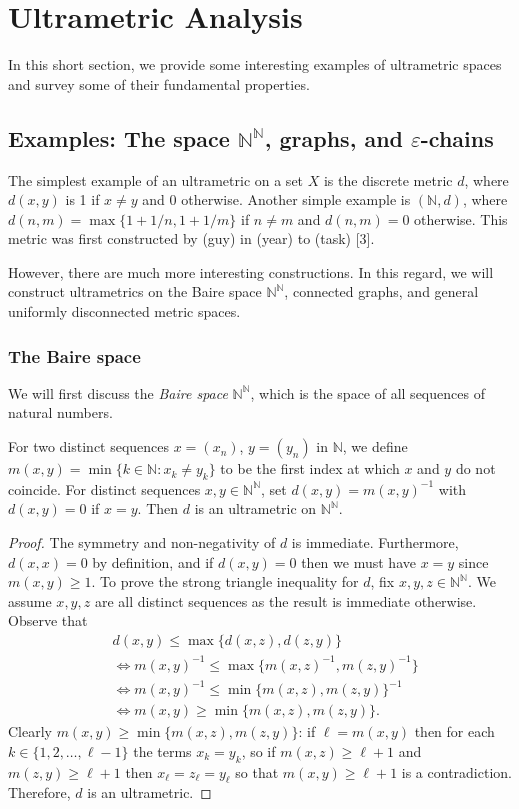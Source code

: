 \section{Ultrametric Analysis}
In this short section, we provide some interesting examples of ultrametric spaces and survey some of their fundamental properties.
\subsection{Examples: The space \( \mathbb{N} ^{\mathbb{N} } \), graphs, and \( \varepsilon  \)-chains} The simplest example of an ultrametric on a set $X$ is the discrete metric $d$, where $d(x,y)$ is 1 if $x \neq y$ and 0 otherwise. Another simple example is $(\mathbb{N}, d)$, where \( d(n,m) = \max \{ 1 + 1/n , 1 + 1/m \}  \) if \( n \neq m \) and \( d(n, m) = 0 \) otherwise. This metric was first constructed by (guy) in (year) to (task) [3]. 

However, there are much more interesting constructions. In this regard, we will construct ultrametrics on the Baire space $\mathbb{N} ^{\mathbb{N} }$, connected graphs, and general uniformly disconnected metric spaces.

\subsubsection{The Baire space} We will first discuss the \emph{Baire space} \( \mathbb{N} ^{\mathbb{N} }  \), which is the space of all sequences of natural numbers.

For two distinct sequences \( x =  (x_{n}) \), \( y = (y_{n} ) \) in \( \mathbb{N}  \), we define \( m(x,y) = \min \{ k \in \mathbb{N} : x_{k} \neq y_{k}  \}  \) to be the first index at which \( x \) and \( y \) do not coincide. For distinct sequences \( x,y \in \mathbb{N} ^{\mathbb{N} }  \), set \( d(x,y) = m(x,y)^{-1}  \) with \( d(x,y) = 0 \) if \( x=y \). Then \( d \) is an ultrametric on \( \mathbb{N} ^{\mathbb{N} }  \).
\begin{proof}
The symmetry and non-negativity of \( d \) is immediate. Furthermore, \( d(x,x) = 0 \) by definition, and if \( d(x,y) = 0  \) then we must have \( x = y \) since \( m(x,y) \geq 1 \). To prove the strong triangle inequality for \( d \), fix \( x,y,z \in \mathbb{N} ^{\mathbb{N} }  \). We assume \( x,y,z \) are all distinct sequences as the result is immediate otherwise. Observe that
\begin{align*}
	&d(x,y) \leq \max \{ d(x,z), d(z,y) \} \\
	&\Leftrightarrow m(x,y)^{-1} \leq \max \{ m(x,z)^{-1} , m(z,y)^{-1}  \}  \\
	&\Leftrightarrow m(x,y)^{-1}  \leq \min \{ m(x,z), m(z,y) \} ^{-1} \\
	&\Leftrightarrow m(x,y) \geq \min \{ m(x,z), m(z,y) \}.
\end{align*}
Clearly \( m(x,y) \geq \min \{ m(x,z), m(z,y) \}  \): if \( \ell = m(x,y) \) then for each \( k \in \{ 1, 2, \hdots , \ell - 1 \} \) the terms \( x_{k} = y_{k}  \), so if \( m(x,z) \geq \ell + 1 \) and \( m(z,y) \geq \ell + 1 \) then \( x_{\ell} = z_{\ell} = y_{\ell}   \) so that \( m(x,y) \geq \ell + 1 \) is a contradiction. Therefore, \( d \) is an ultrametric.
\end{proof}
